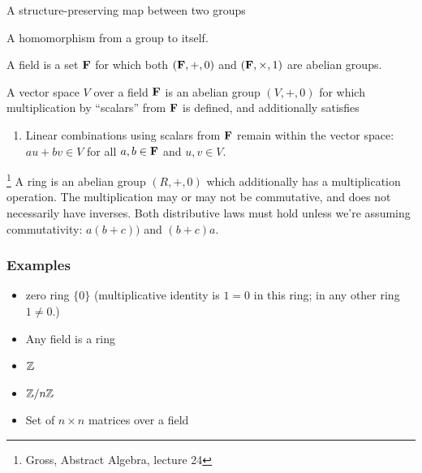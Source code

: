 \begin{definition*}[Homomorphism]
  A structure-preserving map between two groups
\end{definition*}

\begin{definition*}[Endomorphism]
  A homomorphism from a group to itself.
\end{definition*}

\begin{definition*}[Field]
  A field is a set $\mathbf{F}$ for which both $(\mathbf{F}, +, 0)$ and $(\mathbf{F}, \times, 1)$ are abelian groups.
\end{definition*}

\begin{definition*}
  A vector space $V$ over a field $\mathbf{F}$ is an abelian group $(V, +, 0)$ for which
  multiplication by ``scalars'' from $\mathbf{F}$ is defined, and additionally satisfies
  \begin{enumerate}
  \item Linear combinations using scalars from $\mathbf{F}$ remain within the vector
    space:\\
    $au + bv \in V$ for all $a, b \in \mathbf{F}$ and $u, v \in V$.
  \end{enumerate}
\end{definition*}

\begin{definition*}[Ring]\footnote{Gross, Abstract Algebra, lecture 24}
A ring is an abelian group $(R, +, 0)$ which additionally has a multiplication
operation. The multiplication may or may not be commutative, and does not
necessarily have inverses. Both distributive laws must hold unless we're
assuming commutativity: $a(b + c))$ and $(b + c)a$.
\end{definition*}

\subsubsection{Examples}
\begin{itemize}
\item zero ring $\{0\}$ (multiplicative identity is $1 = 0$ in this ring; in
  any other ring $1 \neq 0$.)
\item Any field is a ring
\item $\mathbb{Z}$
\item $\mathbb{Z}/n\mathbb{Z}$
\item Set of $n \times n$ matrices over a field
\end{itemize}

